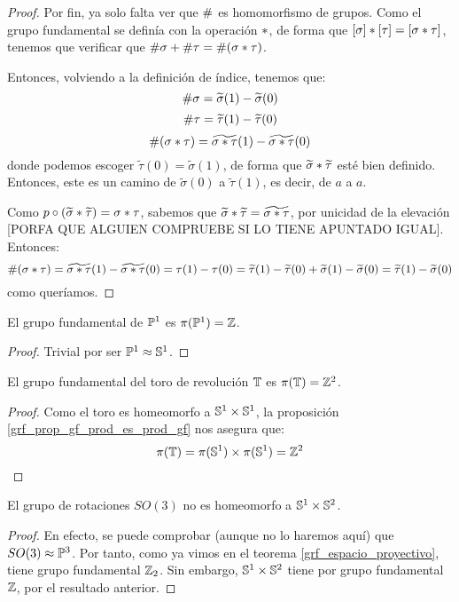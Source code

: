 \begin{theo}
\begin{proof}
Por fin, ya solo falta ver que $\mathrm{\#}$ es homomorfismo de grupos. Como el grupo fundamental se definía con la operación $\mathbin{*}$, de forma que $[\sigma]\mathbin{*}[\tau]=[\sigma\mathbin{*}\tau]$, tenemos que verificar que $\mathrm{\#}\sigma + \mathrm{\#}\tau = \mathrm{\#}(\sigma\mathbin{*}\tau)$.

Entonces, volviendo a la definición de índice, tenemos que:
\[\mathrm{\#}\sigma = \widetilde{\sigma}(1)-\widetilde{\sigma}(0)\]
\[\mathrm{\#}\tau = \widetilde{\tau}(1)-\widetilde{\tau}(0)\]
\[\mathrm{\#}(\sigma\mathbin{*}\tau) = \widetilde{\sigma\mathbin{*}\tau}(1)-\widetilde{\sigma\mathbin{*}\tau}(0)\]
donde podemos escoger $\widetilde{\tau}(0)=\widetilde{\sigma}(1)$, de forma que $\widetilde{\sigma}\mathbin{*}\widetilde{\tau}$ esté bien definido. Entonces, este es un camino de $\widetilde{\sigma}(0)$ a $\widetilde{\tau}(1)$, es decir, de $a$ a $a$.

Como $p\circ(\widetilde{\sigma}\mathbin{*}\widetilde{\tau}) = \sigma\mathbin{*}\tau$, sabemos que $\widetilde{\sigma}\mathbin{*}\widetilde{\tau} = \widetilde{\sigma\mathbin{*}\tau}$, por unicidad de la elevación [PORFA QUE ALGUIEN COMPRUEBE SI LO TIENE APUNTADO IGUAL]. Entonces:
\[\mathrm{\#}(\sigma\mathbin{*}\tau)=\widetilde{\sigma\mathbin{*}\tau}(1)-\widetilde{\sigma\mathbin{*}\tau}(0)=\tau(1)-\tau(0)=\widetilde{\tau}(1)-\widetilde{\tau}(0) + \widetilde{\sigma}(1)-\widetilde{\sigma}(0)=\widetilde{\tau}(1) - \widetilde{\sigma}(0)\]
como queríamos.
\end{proof}
\end{theo}

\begin{cor}
El grupo fundamental de  $\mathbb{P}^1$ es $\pi(\mathbb{P}^1)=\mathbb{Z}$.

\begin{proof}
Trivial por ser $\mathbb{P}^1\approx\mathbb{S}^1$. 
\end{proof}
\end{cor}

\begin{cor}
El grupo fundamental del toro de revolución $\mathbb{T}$ es $\pi(\mathbb{T})=\mathbb{Z}^2$.

\begin{proof}
Como el toro  es homeomorfo a $\mathbb{S}^1\times\mathbb{S}^1$, la proposición \ref{grf_prop_gf_prod_es_prod_gf} nos asegura que:
\[\pi(\mathbb{T})=\pi(\mathbb{S}^1)\times\pi(\mathbb{S}^1)=\mathbb{Z}^2\]
\end{proof}
\end{cor}

\begin{cor}
El grupo de rotaciones  $SO(3)$ no es homeomorfo a $\mathbb{S}^1\times\mathbb{S}^2$.

\begin{proof}
En efecto, se puede comprobar (aunque no lo haremos aquí) que $SO(3)\approx\mathbb{P}^3$. Por tanto, como ya vimos en el teorema \ref{grf_espacio_proyectivo}, tiene grupo fundamental $\mathbb{Z}_2$. Sin embargo, $\mathbb{S}^1\times\mathbb{S}^2$ tiene por grupo fundamental $\mathbb{Z}$, por el resultado anterior.
\end{proof}
\end{cor}